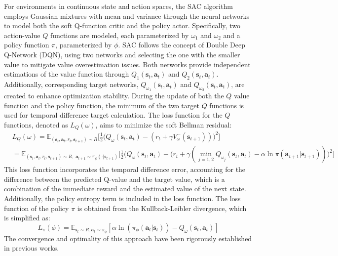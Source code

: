 For environments in continuous state and action spaces, the SAC algorithm employs Gaussian mixtures with mean and variance through the neural networks to model both the soft Q-function critic and the policy actor. Specifically, two action-value $Q$ functions are modeled, each parameterized by $\omega_1$ and $\omega_2$ and a policy function $\pi$, parameterized by $\phi$. SAC follows the concept of Double Deep Q-Network (DQN), using two networks and selecting the one with the smaller value to mitigate value overestimation issues. Both networks provide independent estimations of the value function through $Q_1(\mathbf{s}_t, \mathbf{a}_t)$ and $Q_2(\mathbf{s}_t, \mathbf{a}_t)$. Additionally, corresponding target networks, $Q_{\omega_1}(\mathbf{s}_t, \mathbf{a}_t)$ and $Q_{\omega_2}(\mathbf{s}_t, \mathbf{a}_t)$, are created to enhance optimization stability. During the update of both the $Q$ value function and the policy function, the minimum of the two target $Q$ functions is used for temporal difference target calculation. The loss function for the $Q$ functions, denoted as $L_Q(\omega)$, aims to minimize the soft Bellman residual: 
\begin{equation}
    \begin{aligned}
    &L_Q(\omega) = \mathbb{E}_{(\mathbf{s}_t, \mathbf{a}_t, r_t, \mathbf{s}_{t+1}) \sim R}\bigg[\frac{1}{2}\bigg(Q_\omega(\mathbf{s}_t,\mathbf{a}_t)-(r_t+\gamma V_\omega^- (\mathbf{s}_{t+1}))\bigg)^2\bigg]\\
    &=\mathbb{E}_{(\mathbf{s}_t, \mathbf{a}_t, r_t, \mathbf{s}_{t+1}) \sim R,\;\mathbf{a}_{t+1} \sim \pi_\phi(\cdot|\mathbf{s}_{t+1})}\bigg[\frac{1}{2}\bigg(Q_\omega(\mathbf{s}_t,\mathbf{a}_t)-(r_t+\gamma(\min_{j=1,2}Q_{\omega_j}(\mathbf{s}_t,\mathbf{a}_t)-\alpha\ln\pi(\mathbf{a}_{t+1}|\mathbf{s}_{t+1}))\bigg)^2\bigg]
    \end{aligned}
    \label{eq:lossSAC}
\end{equation}
This loss function incorporates the temporal difference error, accounting for the difference between the predicted Q-value and the target value, which is a combination of the immediate reward and the estimated value of the next state. Additionally, the policy entropy term is included in the loss function. The loss function of the policy $\pi$ is obtained from the Kullback-Leibler divergence, which is simplified as: $$L_\pi(\phi)=\mathbb{E}_{\mathbf{s}_t\sim R,\mathbf{a}_t\sim \pi_\phi}[\alpha\ln(\pi_\phi(\mathbf{a}_t|\mathbf{s}_t))-Q_\omega(\mathbf{s}_t,\mathbf{a}_t)]$$The convergence and optimality of this approach have been rigorously established in previous works\cite{haarnojaSoftActorCriticAlgorithms2019, haarnojaSoftActorCriticOffPolicy2018}. 

